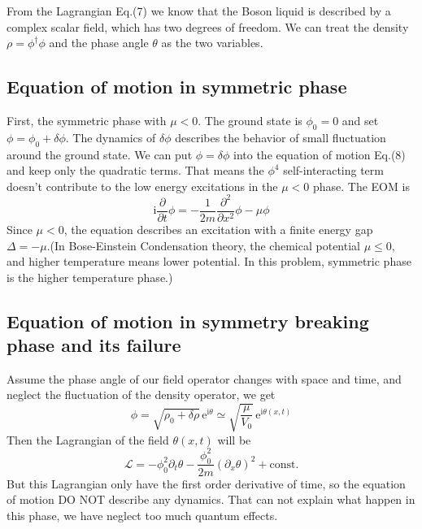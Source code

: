 \documentclass{article}
\newcommand{\im}{\mathrm{i}}
\newcommand{\ep}{\mathrm{e}}
\begin{document}
From the Lagrangian Eq.(7) we know that the Boson liquid is described by a complex scalar field, which has two degrees of freedom. We can treat the density $\rho = \phi^\dagger\phi$ and the phase angle $\theta$ as the two variables.
\subsection{Equation of motion in symmetric phase}
First, the symmetric phase with $\mu < 0$. The ground state is $\phi_0=0$ and set $\phi = \phi_0 + \delta \phi$. The dynamics of $\delta \phi$ describes the behavior of small fluctuation around the ground state. We can put $\phi = \delta \phi$ into the equation of motion Eq.(8) and keep only the quadratic terms. That means the $\phi^4$ self-interacting term doesn't contribute to the low energy excitations in the $\mu < 0$ phase. The EOM is
\begin{equation}
\im \frac{\partial}{\partial t}\phi = -\frac{1}{2m}\frac{\partial^2}{\partial x^2}\phi-\mu\phi
\end{equation}
Since $\mu < 0$, the equation describes an excitation with a finite energy gap $\Delta = -\mu$.(In Bose-Einstein Condensation theory, the chemical potential $\mu \leq 0$, and higher temperature means lower potential. In this problem, symmetric phase is the higher temperature phase.)

\subsection{Equation of motion in symmetry breaking phase and its failure}
Assume the phase angle of our field operator changes with space and time, and neglect the fluctuation of the density operator, we get
$$
\phi =\sqrt{\rho_0 +\delta \rho} \,\ep^{\im \theta} \simeq  \sqrt{\frac{\mu}{V_0}}\,\ep^{\im \theta(x,t)}
$$
Then the Lagrangian of the field $\theta(x,t)$ will be
\begin{equation}
\mathcal{L} = -\phi_0^2 \partial_t \theta -\frac{\phi_0^2}{2m}(\partial_x \theta)^2 + \mathrm{const.}
\end{equation}
But this Lagrangian only have the first order derivative of time, so the equation of motion DO NOT describe any dynamics. That can not explain what happen in this phase, we have neglect too much quantum effects.
\end{document}
